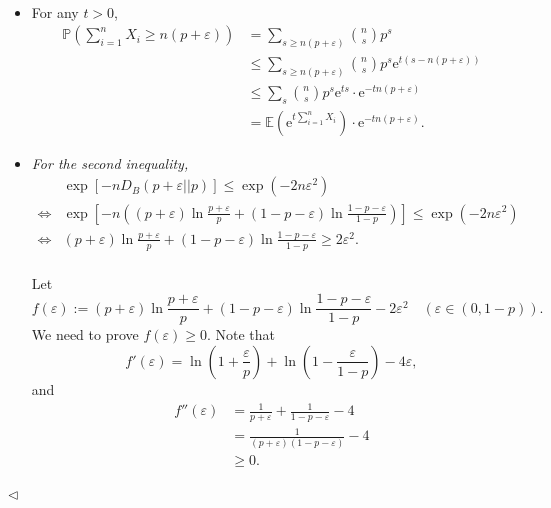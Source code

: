 ﻿\documentclass[11pt]{article}
\newenvironment{answer}[1][Answer]{\begin{trivlist}
\item[\hskip \labelsep {\bfseries #1.}\hskip \labelsep]}{\hfill$\lhd$\end{trivlist}}
\begin{document}
\begin{answer} ~
\begin{itemize}
    \item [(1)] For any $t>0$,
        $$
            \begin{aligned}
                \mathbb{P}\left(\sum_{i=1}^n X_i\ge n(p+\varepsilon)\right)
                &= \sum_{s\ge n(p+\varepsilon)} \binom{n}{s} p^s\\
                &\le \sum_{s\ge n(p+\varepsilon)} \binom{n}{s} p^s \mathrm{e}^{t(s-n(p+\varepsilon))}\\
                &\le \sum_{s} \binom{n}{s} p^s \mathrm{e}^{ts} \cdot \mathrm{e}^{-tn(p+\varepsilon)}\\
                &= \mathbb{E}\left(\mathrm{e}^{t\sum_{i=1}^{n}X_i}\right)\cdot \mathrm{e}^{-tn(p+\varepsilon)}.
            \end{aligned}
        $$
    \item [(2)] \textit{For the second inequality,}
        $$
            \begin{aligned}
                &\exp\left[-nD_B(p+\varepsilon||p)\right] \leq \exp(-2n\varepsilon^2)\\
                \Leftrightarrow & \exp\left[-n\left((p+\varepsilon)\ln\frac{p+\varepsilon}{p}+(1-p-\varepsilon)\ln\frac{1-p-\varepsilon}{1-p}\right)\right] \leq \exp(-2n\varepsilon^2)\\
                \Leftrightarrow & (p+\varepsilon)\ln\frac{p+\varepsilon}{p}+(1-p-\varepsilon)\ln\frac{1-p-\varepsilon}{1-p} \geq 2\varepsilon^2.\\
            \end{aligned}
        $$

        Let
        $$
            f(\varepsilon):=(p+\varepsilon)\ln\frac{p+\varepsilon}{p}+(1-p-\varepsilon)\ln\frac{1-p-\varepsilon}{1-p}-2\varepsilon^2\quad (\varepsilon\in(0,1-p)).
        $$
        We need to prove $f(\varepsilon)\ge 0$. Note that
        $$
            f'(\varepsilon)=\ln\left(1+\frac{\varepsilon}{p}\right)+\ln\left(1-\frac{\varepsilon}{1-p}\right)-4\varepsilon,
        $$
        and
        $$
            \begin{aligned}
                f''(\varepsilon) &= \frac{1}{p+\varepsilon}+\frac{1}{1-p-\varepsilon}-4\\
                &= \frac{1}{(p+\varepsilon)(1-p-\varepsilon)}-4\\
                &\ge 0.
            \end{aligned}
        $$


\end{itemize}
\end{answer}
\end{document}
